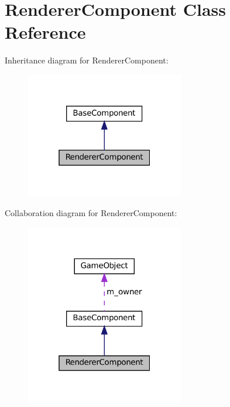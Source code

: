 \hypertarget{classRendererComponent}{}\section{Renderer\+Component Class Reference}
\label{classRendererComponent}


Inheritance diagram for Renderer\+Component\+:
\nopagebreak
\begin{figure}[H]
\begin{center}
\leavevmode
\includegraphics[width=196pt]{classRendererComponent__inherit__graph}
\end{center}
\end{figure}


Collaboration diagram for Renderer\+Component\+:
\nopagebreak
\begin{figure}[H]
\begin{center}
\leavevmode
\includegraphics[width=196pt]{classRendererComponent__coll__graph}
\end{center}
\end{figure}
